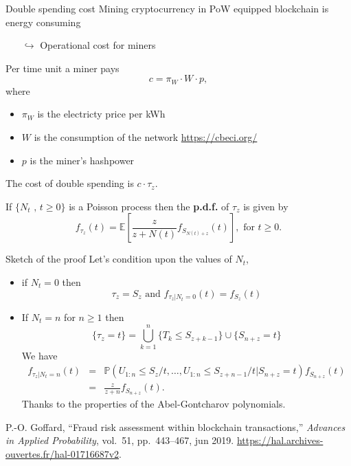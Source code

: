 \documentclass{beamer}
\begin{document}
\begin{frame}{Double spending cost}
\scriptsize
Mining cryptocurrency in PoW equipped blockchain is energy consuming
\begin{itemize}
\item[$\hookrightarrow$] Operational cost for miners
\end{itemize}
Per time unit a miner pays
$$
c = \pi_W\cdot W\cdot p,
$$
where 
\begin{itemize}
  \item $\pi_W$ is the electricty price per kWh
  \item $W$ is the consumption of the network \url{https://cbeci.org/}
  \item  $p$ is the miner's hashpower 
\end{itemize}
\begin{tcolorbox}[enhanced,drop shadow, title=Fact]
The cost of double spending is $c\cdot \tau_z$.
\end{tcolorbox}
\begin{tcolorbox}[enhanced,drop shadow, title=Theorem (\textbf{P.d.f.} of the double spending time)]
If $\{N_t\text{ , }t\geq0\}$ is a Poisson process then the \textbf{p.d.f.} of $\tau_z$ is given by
\begin{equation*}
f_{\tau_z}(t)=\mathbb{E}\left[\frac{z}{z+N(t)}f_{S_{N(t)+z}}(t)\right],\text{ for }t\geq0.
\end{equation*}
\end{tcolorbox}
\end{frame}
\begin{frame}{Sketch of the proof}
\scriptsize
Let's condition upon the values of $N_t$,
\begin{itemize}
  \item if $N_t=0$ then 
  $$\tau_z = S_z\text{ and }f_{\tau_z|N_t=0}(t) = f_{S_z}(t)$$
  \item If $N_t = n$ for $n\geq 1$ then 
  $$
  \{\tau_z = t\} = \bigcup_{k = 1}^n\{T_k\leq S_{z+k-1}\}\cup\{S_{n+z} = t\}
  $$
We have 
\begin{eqnarray*}
f_{\tau_z|N_t = n}(t) &=& \mathbb{P}(U_{1:n}\leq S_z/t,\ldots,U_{1:n}\leq S_{z+n-1}/t\Big\rvert S_{n+z}=t)f_{S_{n+z}}(t)\\
&=&\frac{z}{z+n}f_{S_{n+z}}(t).
\end{eqnarray*}
Thanks to the properties of the Abel-Gontcharov polynomials.
\end{itemize}
\begin{thebibliography}{1}

P.-O. Goffard, ``Fraud risk assessment within blockchain transactions,'' {\em
  Advances in Applied Probability}, vol.~51, pp.~443--467, jun 2019.
\newblock \url{https://hal.archives-ouvertes.fr/hal-01716687v2}.

\end{thebibliography}
\end{frame}
\end{document}
